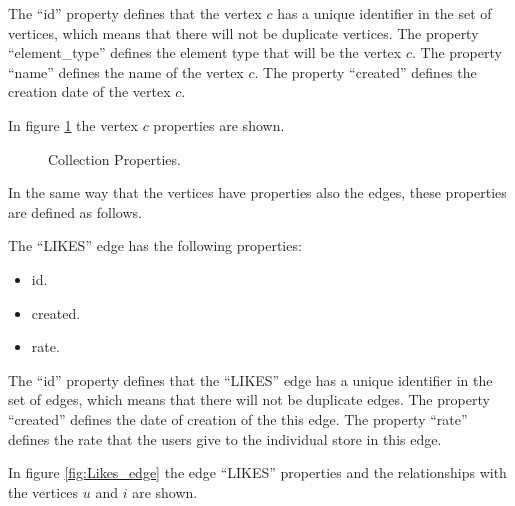 \documentclass[conference]{IEEEtran}
\begin{document}
The “id” property defines that the vertex $c$ has a unique identifier in the set
of vertices, which means that there will not be duplicate vertices. The property
“element\_type” defines the element type that will be the vertex $c$. The
property “name” defines the name of the vertex $c$. The property “created”
defines the creation date of the vertex $c$.

In figure \ref{fig:Collection_node} the vertex $c$ properties are shown.

\begin{figure}
\captionsetup{justification=centering,margin=2cm}
\centering
\setlength\fboxsep{0pt}
\setlength\fboxrule{0.7pt}
\caption{Collection Properties.}
\label{fig:Collection_node}       
\end{figure}

In the same way that the vertices have properties also the edges, these
properties are defined as follows.

The “LIKES” edge has the following properties:

\begin{itemize} 
\item id. 
\item created. 
\item rate.
\end{itemize}

The “id” property defines that the “LIKES” edge  has a unique identifier in the
set of edges, which means that there will not be duplicate edges. The property
“created” defines the date of creation of the this edge. The property “rate”
defines the rate that the users give to the individual store in this edge.

In figure \ref{fig:Likes_edge} the edge “LIKES” properties and the relationships with the vertices $u$ and $i$ are shown.
\end{document}
